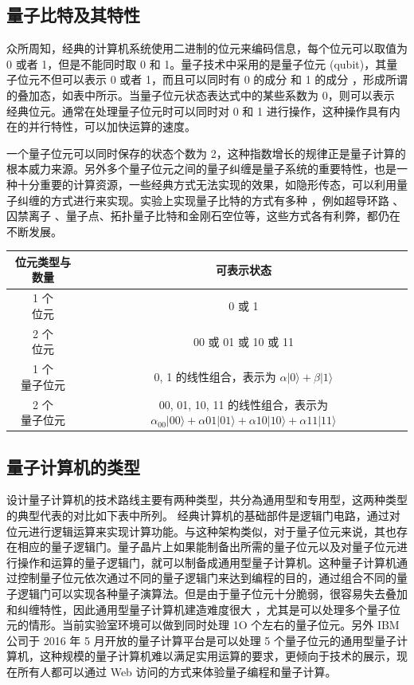 \subsection{量子比特及其特性}

众所周知，经典的计算机系统使用二进制的位元来编码信息，每个位元可以取值为 0 或者 1，但是不能同时取 0 和 1。量子技术中采用的是量子位元 (qubit)，其量子位元不但可以表示 0 或者 1，而且可以同时有 0 的成分 和 1 的成分 ，形成所谓的叠加态，如表中所示。当量子位元状态表达式中的某些系数为 0，则可以表示 经典位元。通常在处理量子位元时可以同时对 0 和 1 进行操作，这种操作具有内在的并行特性，可以加快运算的速度。

一个量子位元可以同时保存的状态个数为 2，这种指数增长的规律正是量子计算的根本威力来源。另外多个量子位元之间的量子纠缠是量子系统的重要特性，也是一种十分重要的计算资源，一些经典方式无法实现的效果，如隐形传态，可以利用量子纠缠的方式进行来实现。实验上实现量子比特的方式有多种 ，例如超导环路 、囚禁离子 、量子点、拓扑量子比特和金刚石空位等，这些方式各有利弊，都仍在不断发展。

\begin{center}
\begin{tabular}{cc}
\hline
位元类型与数量 & 可表示状态 \\
\hline
\thead{1 个\\位元} & 0 或 1 \\
\thead{2 个\\位元} & 00 或 01 或 10 或 11 \\
\thead{1 个\\量子位元} & \thead{0, 1 的线性组合，表示为\\$\alpha|0\rangle+\beta|1\rangle$ } \\
\thead{2 个\\量子位元} & \thead{00, 01, 10, 11 的线性组合，表示为\\$\alpha_{00}|00\rangle+\alpha 01|01\rangle+\alpha 10|10\rangle+\alpha 11|11\rangle$} \\
\hline
\end{tabular}
\end{center}

\subsection{量子计算机的类型}

设计量子计算机的技术路线主要有两种类型，共分為通用型和专用型，这两种类型的典型代表的对比如下表中所列。
经典计算机的基础部件是逻辑门电路，通过对位元进行逻辑运算来实现计算功能。与这种架构类似，对于量子位元来说，其也存在相应的量子逻辑门。量子晶片上如果能制备出所需的量子位元以及对量子位元进行操作和运算的量子逻辑门，就可以制备成通用型量子计算机。这种量子计算机通过控制量子位元依次通过不同的量子逻辑门来达到编程的目的，通过组合不同的量子逻辑门可以实现各种量子演算法。但是由于量子位元十分脆弱，很容易失去叠加和纠缠特性，因此通用型量子计算机建造难度很大 ，尤其是可以处理多个量子位元的情形。当前实验室环境可以做到同时处理 1O 个左右的量子位元。另外 IBM 公司于 2016 年 5 月开放的量子计算平台是可以处理 5 个量子位元的通用型量子计算机，这种规模的量子计算机难以满足实用运算的要求，更倾向于技术的展示，现在所有人都可以通过 Web 访问的方式来体验量子编程和量子计算。

